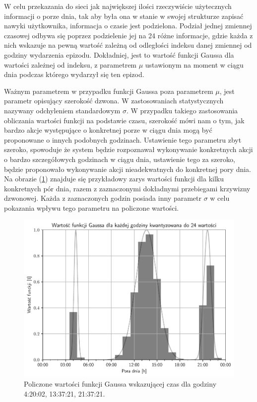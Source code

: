 W celu przekazania do sieci jak największej ilości rzeczywiście użytecznych informacji o porze dnia, tak aby była ona w stanie w swojej strukturze zapisać nawyki użytkownika, informacja o czasie jest podzielona. Podział jednej zmiennej czasowej odbywa się poprzez podzielenie jej na 24 różne informacje, gdzie każda z nich wskazuje na pewną wartość zależną od odległości indeksu danej zmiennej od godziny wydarzenia epizodu. Dokładniej, jest to wartość funkcji Gaussa dla wartości zależnej od indeksu, z parametrem $\mu$ ustawionym na moment w ciągu dnia podczas którego wydarzył się ten epizod.

Ważnym parametrem w przypadku funkcji Gaussa poza parametrem $\mu$, jest parametr opisujący szerokość dzwona. W zastosowaniach statystycznych nazywany odchyleniem standardowym $\sigma$. W przypadku takiego zastosowania obliczania wartości funkcji na podstawie czasu, szerokość mówi nam o tym, jak bardzo akcje występujące o konkretnej porze w ciągu dnia mogą być proponowane o innych podobnych godzinach. Ustawienie tego parametru zbyt szeroko, spowoduje że system będzie rozpoznawał wykonywanie konkretnych akcji o bardzo szczegółowych godzinach w ciągu dnia, ustawienie tego za szeroko, będzie proponowało wykonywanie akcji nieadekwatnych do konkretnej pory dnia. Na obrazie (\ref{fig:time_param}) znajduje się przykładowy zarys wartości funkcji dla kilku konkretnych pór dnia, razem z zaznaczonymi dokładnymi przebiegami krzywizny dzwonowej. Każda z zaznaczonych godzin posiada inny parametr $\sigma$ w celu pokazania wpływu tego parametru na policzone wartości.

\begin{figure}
    \centering\includegraphics[width=1.00\textwidth]{img/time_param.pdf}
    \caption{Policzone wartości funkcji Gaussa wskazującej czas dla godziny 4:20:02, 13:37:21, 21:37:21.} \label{fig:time_param}
\end{figure}


